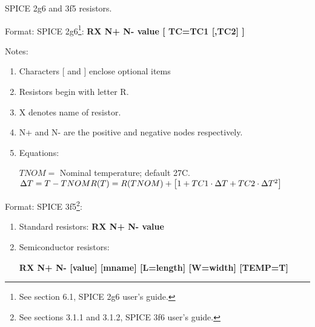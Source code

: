 %
%
%
%

\renewcommand{\thesubfigure}{\thefigure(\alph{subfigure})}
\makeatletter
  \renewcommand{\@thesubfigure}{\thesubfigure:\space}
  \renewcommand{\p@subfigure}{}
\makeatother

\renewcommand{\thesubtable}{\thetable(\alph{subtable})}
\makeatletter
  \renewcommand{\@thesubtable}{\thesubtable:\space}
  \renewcommand{\p@subtable}{}
\makeatother

SPICE 2g6 and 3f5 resistors.


\begin{flushleft}
Format: SPICE 2g6\footnote{See section 6.1, SPICE 2g6 user's guide.}: \hspace*{5mm}
\textbf{RX N+ N- value [ TC=TC1 [,TC2] ]}                                                                                                                                                                            \end{flushleft}

Notes: 
\begin{enumerate}
 \item Characters [ and ] enclose optional items 
 \item Resistors begin with letter R.
 \item X denotes name of resistor.
 \item N+ and N- are the positive and negative nodes respectively.
 \item Equations:
\begin{flushleft}
$ TNOM = $ Nominal temperature; default 27\degree C.
\linebreak 
  $\Delta T = T-TNOM
\linebreak 
  R(T) = R(TNOM)+\left[ 1+TC1 \cdot \Delta T+TC2 \cdot \Delta T^{2} \right] $
\end{flushleft}
\end{enumerate}

\begin{flushleft}
Format: SPICE 3f5\footnote{See sections 3.1.1 and 3.1.2, SPICE 3f6 user's guide.}:
\begin{enumerate}
\item Standard resistors: \textbf{RX N+ N- value}
\item Semiconductor resistors: 

\textbf{RX N+ N- [value] [mname] [L=length] [W=width] [TEMP=T]}                                                                                                                                                                                                                            \end{enumerate}
 \end{flushleft}

